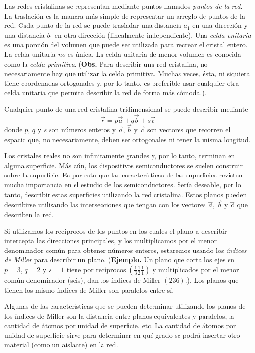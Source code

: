 \documentclass[12pt]{article}
\begin{document}
Las redes cristalinas se representan mediante puntos llamados \emph{puntos de la red}. La traslación es la manera más simple de representar un arreglo de puntos de la red. Cada punto de la red se puede trasladar una distancia $a_{1}$ en una dirección y una distancia $b_{1}$ en otra dirección (linealmente independiente). Una \emph{celda unitaria} es una porción del volumen que puede ser utilizada para recrear el cristal entero. La celda unitaria \emph{no} es única. La celda unitaria de menor volumen es conocida como la \emph{celda primitiva}. (\textbf{Obs.} Para describir una red cristalina, no necesariamente hay que utilizar la celda primitiva. Muchas veces, ésta, ni siquiera tiene coordenadas ortogonales y, por lo tanto, es preferible usar cualquier otra celda unitaria que permita describir la red de forma más cómoda.).

Cualquier punto de una red cristalina tridimensional se puede describir mediante
\[ \vec{r}=p\vec{a}+q\vec{b}+s\vec{c} \]
donde $p$, $q$ y $s$ son números enteros y $\vec{a}$, $\vec{b}$ y $\vec{c}$ son vectores que recorren el espacio que, no necesariamente, deben ser ortogonales ni tener la misma longitud.

Los cristales reales no son infinitamente grandes y, por lo tanto, terminan en alguna superficie. Más aún, los dispositivos semiconductores se suelen construir sobre la superficie. Es por esto que las características de las superficies revisten mucha importancia en el estudio de los semiconductores. Sería deseable, por lo tanto, describir estas superficies utilizando la red cristalina. Estos planos pueden describirse utilizando las intersecciones que tengan con los vectores $\vec{a}$, $\vec{b}$ y $\vec{c}$ que describen la red.

Si utilizamos los recíprocos de los puntos en los cuales el plano a describir intercepta las direcciones principales, y los multiplicamos por el menor denominador común para obtener números enteros, estaremos usando los \emph{índices de Miller} para describir un plano. (\textbf{Ejemplo.} Un plano que corta los ejes en $p=3$, $q=2$ y $s=1$ tiene por recíprocos $(\frac{1}{3}\frac{1}{2}\frac{1}{1})$ y multiplicados por el menor común denominador (seis), dan los índices de Miller $(236)$.). Los planos que tienen los mismo índices de Miller son paralelos entre sí.

Algunas de las características que se pueden determinar utilizando los planos de los índices de Miller son la distancia entre planos equivalentes y paralelos, la cantidad de átomos por unidad de superficie, etc. La cantidad de átomos por unidad de superficie sirve para determinar en qué grado se podrá insertar otro material (como un aislante) en la red.
\end{document}
